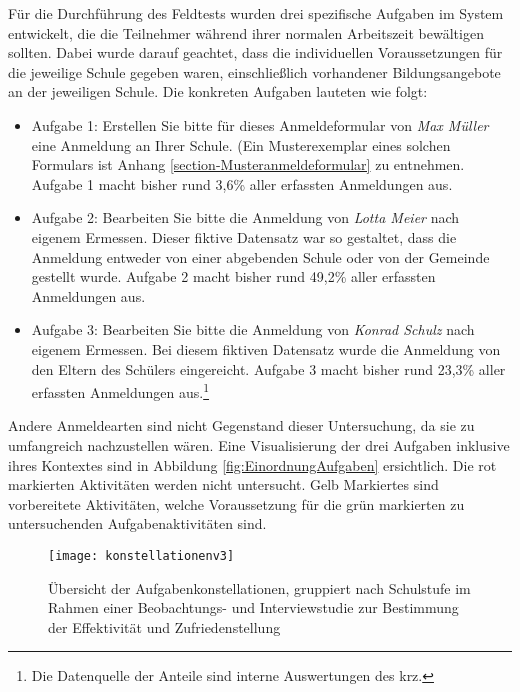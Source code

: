 Für die Durchführung des Feldtests wurden drei spezifische Aufgaben im System entwickelt, die die Teilnehmer während ihrer normalen Arbeitszeit bewältigen sollten. Dabei wurde darauf geachtet, dass die individuellen  Voraussetzungen für die jeweilige Schule gegeben waren, einschließlich  vorhandener Bildungsangebote an der jeweiligen Schule. Die konkreten Aufgaben lauteten wie folgt:

\begin{itemize}
\item Aufgabe 1: \glqq Erstellen Sie bitte für dieses Anmeldeformular von \textit{Max Müller} eine Anmeldung an Ihrer Schule.\grqq{} (Ein Musterexemplar eines solchen Formulars ist Anhang \ref{section-Musteranmeldeformular} zu entnehmen. Aufgabe 1 macht bisher rund 3,6\% aller erfassten Anmeldungen aus.
\item Aufgabe 2: \glqq Bearbeiten Sie bitte die Anmeldung von \textit{Lotta Meier} nach eigenem Ermessen.\grqq{}  Dieser fiktive Datensatz war so gestaltet, dass die Anmeldung entweder von einer abgebenden Schule oder von der Gemeinde gestellt wurde. Aufgabe 2 macht bisher rund 49,2\% aller erfassten Anmeldungen aus.
\item Aufgabe 3: \glqq Bearbeiten Sie bitte die Anmeldung von \textit{Konrad Schulz} nach eigenem Ermessen.\grqq{}  Bei diesem fiktiven Datensatz wurde die Anmeldung von den Eltern des Schülers eingereicht. Aufgabe 3 macht bisher rund 23,3\% aller erfassten Anmeldungen aus.\footnote{Die Datenquelle der Anteile sind interne Auswertungen des krz.}
\end{itemize}

Andere Anmeldearten sind nicht Gegenstand dieser Untersuchung, da sie zu umfangreich nachzustellen wären. Eine Visualisierung der drei Aufgaben inklusive ihres Kontextes sind in Abbildung \ref{fig:EinordnungAufgaben} ersichtlich. Die rot markierten Aktivitäten werden nicht untersucht. Gelb Markiertes sind vorbereitete Aktivitäten, welche Voraussetzung für die grün markierten zu untersuchenden Aufgabenaktivitäten sind. 

\begin{figure}[H]
    \caption{Übersicht der Aufgabenkonstellationen, gruppiert nach Schulstufe im Rahmen einer Beobachtungs- und Interviewstudie zur Bestimmung der Effektivität und Zufriedenstellung}
    \texttt{[image: konstellationenv3]}
    \label{fig:konstellationenv3}
\end{figure}


